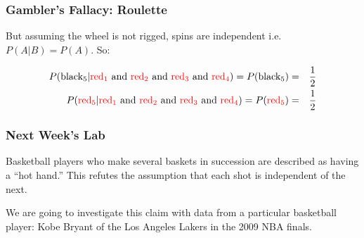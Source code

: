 \documentclass[handout]{beamer}
\newcommand{\blue}[1]{\textcolor{blue2}{#1}}
\begin{document}
\begin{frame}
\frametitle{Gambler's Fallacy: Roulette}
But assuming the wheel is not rigged, spins are independent i.e. $P(A|B) = P(A)$.  So:

\pause \begin{eqnarray*}
P(\mbox{black}_5 | \textcolor{red}{\mbox{red}_1} \mbox{ and } \textcolor{red}{\mbox{red}_2} \mbox{ and } \textcolor{red}{\mbox{red}_3} \mbox{ and } \textcolor{red}{\mbox{red}_4}) = P(\mbox{black}_5) &=& \frac{1}{2} \\
P(\textcolor{red}{\mbox{red}_5} | \textcolor{red}{\mbox{red}_1} \mbox{ and } \textcolor{red}{\mbox{red}_2} \mbox{ and } \textcolor{red}{\mbox{red}_3} \mbox{ and } \textcolor{red}{\mbox{red}_4}) = P(\textcolor{red}{\mbox{red}_5}) &=& \frac{1}{2}
\end{eqnarray*}


\end{frame}


%


\begin{frame}
\frametitle{Next Week's Lab}

Basketball players who make several baskets in succession are described as having a ``hot hand.''  This refutes the assumption that each shot is \blue{independent} of the next. 

\vspace{0.5cm}

We are going to investigate this claim with data from a particular basketball player: Kobe Bryant of the Los Angeles Lakers in the 2009 NBA finals.

\end{frame}
\end{document}
